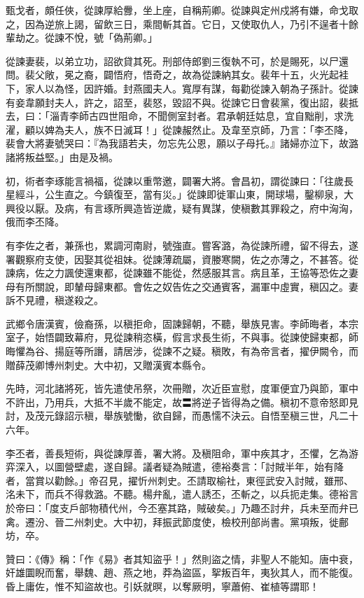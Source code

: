 \begin{pinyinscope}
 甄戈者，頗任俠，從諫厚給釁，坐上座，自稱荊卿。從諫與定州戍將有嫌，命戈取之，因為逆旅上謁，留飲三日，乘間斬其首。它日，又使取仇人，乃引不逞者十餘輩劫之。從諫不悅，號「偽荊卿。」



 從諫妻裴，以弟立功，詔欲貸其死。刑部侍郎劉三復執不可，於是賜死，以尸還問。裴父敞，冕之裔，闢悟府，悟奇之，故為從諫納其女。裴年十五，火光起袿下，家人以為怪，因許婚。封燕國夫人。寬厚有謀，每勸從諫入朝為子孫計。從諫有妾韋願封夫人，許之，詔至，裴怒，毀詔不與。從諫它日會裴黨，復出詔，裴抵去，曰：「淄青李師古四世阻命，不聞側室封者。君承朝廷姑息，宜自黜削，求洗濯，顧以婢為夫人，族不日滅耳！」從諫赧然止。及韋至京師，乃言：「李丕降，裴會大將妻號哭曰：『為我語若夫，勿忘先公恩，願以子母托。』諸婦亦泣下，故潞諸將叛益堅。」由是及禍。



 初，術者李琢能言禍福，從諫以重幣邀，闢署大將。會昌初，謂從諫曰：「往歲長星經斗，公生直之。今鎮復至，當有災。」從諫即徙軍山東，開球場，鑿柳泉，大興役以厭。及病，有言琢所興造皆逆歲，疑有異謀，使稹數其罪殺之，府中洶洶，俄而李丕降。



 有李佐之者，兼孫也，累調河南尉，號強直。嘗客潞，為從諫所禮，留不得去，遂署觀察府支使，因娶其從祖妹。從諫薄疏屬，資媵寒闕，佐之亦薄之，不甚答。從諫病，佐之力諷使還東都，從諫雖不能從，然感服其言。病且革，王協等恐佐之妻母有所關說，即輦母歸東都。會佐之奴告佐之交通賓客，漏軍中虛實，稹囚之。妻訴不見禮，稹遂殺之。



 武鄉令唐漢賓，儉裔孫，以稹拒命，固諫歸朝，不聽，舉族見害。李師晦者，本宗室子，始悟闢致幕府，見從諫稍恣橫，假言求長生術，不與事。從諫使歸東都，師晦懼為谷、揚庭等所譖，請居涉，從諫不之疑。稹敗，有為帝言者，擢伊闕令，而贈薛茂卿博州刺史。大中初，又贈漢賓本縣令。



 先時，河北諸將死，皆先遣使吊祭，次冊贈，次近臣宣慰，度軍便宜乃與節，軍中不許出，乃用兵，大抵不半歲不能定，故〓將逆子皆得為之備。稹初不意帝怒即見討，及茂元錄詔示稹，舉族號慟，欲自歸，而愚懦不決云。自悟至稹三世，凡二十六年。



 李丕者，善長短術，與從諫厚善，署大將。及稹阻命，軍中疾其才，丕懼，乞為游弈深入，以圖營壁處，遂自歸。議者疑為賊遣，德裕奏言：「討賊半年，始有降者，當賞以勸餘。」帝召見，擢忻州刺史。丕請取榆社，東徑武安入討賊，雖邢、洺未下，而兵不得救潞。不聽。楊弁亂，遣人誘丕，丕斬之，以兵扼走集。德裕言於帝曰：「度支戶部物積代州，今丕塞其路，賊破矣。」乃趣丕討弁，兵未至而弁已禽。遷汾、晉二州刺史。大中初，拜振武節度使，檢校刑部尚書。黨項叛，徙鄜坊，卒。



 贊曰：《傳》稱：「作《易》者其知盜乎！」然則盜之情，非聖人不能知。唐中衰，奸雄圜睨而奮，舉魏、趙、燕之地，莽為盜區，挐叛百年，夷狄其人，而不能復。昏上庸佐，惟不知盜故也。引妖就暝，以奪厥明，寧蕭俯、崔植等謂耶！



\end{pinyinscope}